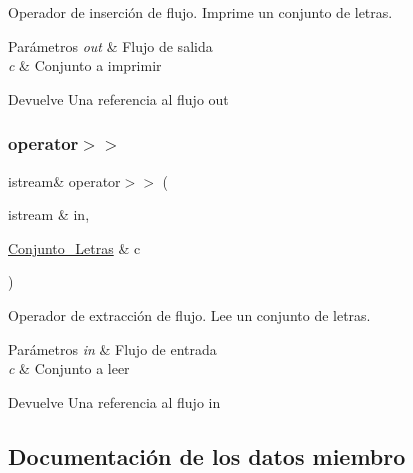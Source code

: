 Operador de inserción de flujo. Imprime un conjunto de letras. 


\begin{DoxyParams}{Parámetros}
{\em out} & Flujo de salida \\
\hline
{\em c} & Conjunto a imprimir \\
\hline
\end{DoxyParams}
\begin{DoxyReturn}{Devuelve}
Una referencia al flujo out 
\end{DoxyReturn}
\mbox{\label{classConjunto__Letras_abf08384cdc42718a16ac3604ddd954cf}} 
\subsubsection{\texorpdfstring{operator$>$$>$}{operator>>}}
{\footnotesize\ttfamily istream\& operator$>$$>$ (\begin{DoxyParamCaption}\item[{istream \&}]{in,  }\item[{\hyperlink{classConjunto__Letras}{Conjunto\+\_\+\+Letras} \&}]{c }\end{DoxyParamCaption})\hspace{0.3cm}{\ttfamily [friend]}}



Operador de extracción de flujo. Lee un conjunto de letras. 


\begin{DoxyParams}{Parámetros}
{\em in} & Flujo de entrada \\
\hline
{\em c} & Conjunto a leer \\
\hline
\end{DoxyParams}
\begin{DoxyReturn}{Devuelve}
Una referencia al flujo in 
\end{DoxyReturn}


\subsection{Documentación de los datos miembro}
\mbox{\label{classConjunto__Letras_a9b9b3e1c3fd227d0fe961769f5e05894}} 

